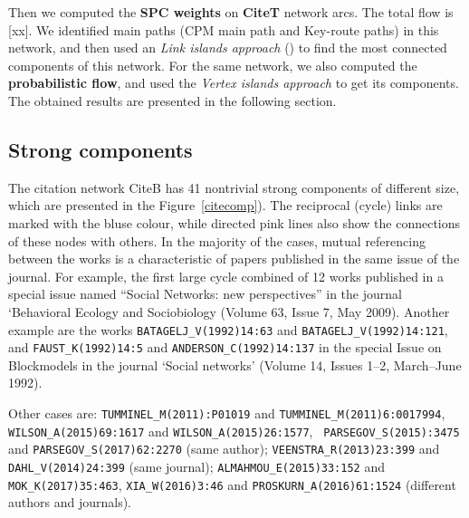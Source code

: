 \documentclass[11pt]{article} %
\begin{document}
Then we computed the \textbf{SPC weights} on \textbf{CiteT} network arcs. The total flow is [xx]. We identified main paths (CPM main path and Key-route paths) in this network, and then used an \textit{Link islands approach} () to find the most connected components of this network. For the same network, we also computed the \textbf{probabilistic flow}, and used the \textit{Vertex islands approach} to get its components. The obtained results are presented in the following section. \medskip

\subsection{Strong components}  

The citation network CiteB has 41 nontrivial strong components of different size, which are presented in the  Figure~\ref{citecomp}). The reciprocal (cycle) links are marked with the bluse colour, while directed pink lines also show the connections of these nodes with others. In the majority of the cases, mutual referencing between the works is a characteristic of papers published in the same issue of the journal. For example, the first large cycle combined of 12 works published in a special issue named “Social Networks: new perspectives” in the journal `Behavioral Ecology and Sociobiology (Volume 63, Issue 7, May 2009). Another example are the works \texttt {BATAGELJ\_V(1992)14:63} and \texttt {BATAGELJ\_V(1992)14:121}, and \texttt {FAUST\_K(1992)14:5} and \texttt {ANDERSON\_C(1992)14:137} in the special Issue on Blockmodels in the journal `Social networks' (Volume 14, Issues 1–2, March–June 1992). \medskip

Other cases are: \texttt {TUMMINEL\_M(2011):P01019} and \texttt {TUMMINEL\_M(2011)6:0017994}, \texttt {WILSON\_A(2015)69:1617} and \texttt {WILSON\_A(2015)26:1577}, \texttt { PARSEGOV\_S(2015):3475} and \texttt {PARSEGOV\_S(2017)62:2270} (same author); \texttt {VEENSTRA\_R(2013)23:399} and \texttt {DAHL\_V(2014)24:399} (same journal); \texttt {ALMAHMOU\_E(2015)33:152} and \texttt {MOK\_K(2017)35:463}, \texttt {XIA\_W(2016)3:46} and \texttt {PROSKURN\_A(2016)61:1524} (different authors and journals). \medskip
\end{document}
